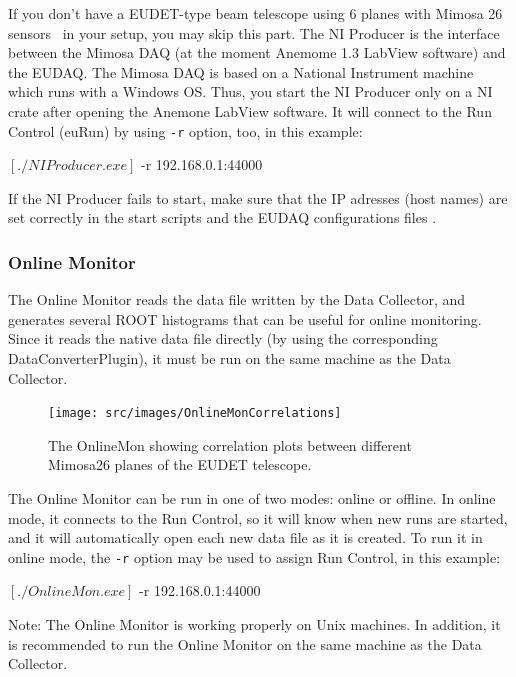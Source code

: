 If you don't have a EUDET-type beam telescope using 6 planes with Mimosa 26 sensors~\cite{Jansen:2016} in your setup, you may skip this part.
The NI Producer is the interface between the Mimosa DAQ (at the moment Anemome 1.3 LabView software) and the EUDAQ. 
The Mimosa DAQ is based on a National Instrument machine which runs with a Windows OS. 
Thus, you start the NI Producer only on a NI crate after opening the Anemone LabView software.
It will connect to the Run Control (euRun) by using \texttt{-r} option, too, in this example:
\begin{listing}[mybash]
$[./NIProducer.exe]$ -r 192.168.0.1:44000
\end{listing}
If the NI Producer fails to start, make sure that the IP adresses (host names) are set correctly in the start scripts and the EUDAQ configurations files \cite[section 5.2.1.2 1.]{telescopesWikiUserManual}.


\subsubsection{Online Monitor}
The Online Monitor reads the data file written by the Data Collector,
and generates several ROOT histograms that can be useful for online monitoring.
Since it reads the native data file directly (by using the corresponding DataConverterPlugin), it must be run on the same machine as the Data Collector.

\begin{figure}[htb]
  \begin{center}
    \texttt{[image: src/images/OnlineMonCorrelations]}
    \caption{The OnlineMon showing correlation plots between different
      Mimosa26 planes of the EUDET telescope.}
    \label{fig:OnlineMonPlots}
  \end{center}
\end{figure}

The Online Monitor can be run in one of two modes: online or offline.
In online mode, it connects to the Run Control, so it will know when new runs are started,
and it will automatically open each new data file as it is created.
To run it in online mode, the \texttt{-r} option may be used to assign Run Control, in this example:
\begin{listing}[mybash]
$[./OnlineMon.exe]$ -r 192.168.0.1:44000
\end{listing}
Note: The Online Monitor is working properly on Unix machines. In addition, it is recommended to run the Online Monitor on the same machine as the Data Collector.

